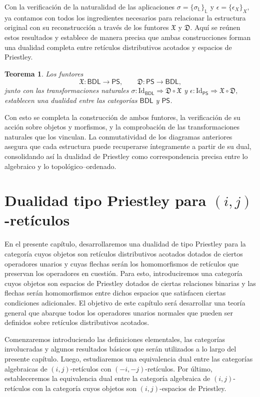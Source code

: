 \documentclass[12pt]{book}
\newtheorem{theorem}{Teorema}[section]
\newcommand{\X}{\mathfrak{X}}
\newcommand{\D}{\mathfrak{D}}
\begin{document}
\medskip

Con la verificación de la naturalidad de las aplicaciones
\(
\sigma=\{\sigma_{\mathbb{L}}\}_{\mathbb{L}}
\)
y
\(
\epsilon=\{\epsilon_{X}\}_{X},
\)
ya contamos con todos los ingredientes necesarios para relacionar
la estructura original con su reconstrucción a través de los funtores
\(\X\) y \(\D\). Aquí se reúnen estos resultados y establece de manera precisa que ambas construcciones forman una dualidad completa entre
retículos distributivos acotados y espacios de Priestley.

\begin{theorem}
Los funtores 
\[
\X\colon \mathsf{BDL}\to\mathsf{PS},
\qquad
\D\colon \mathsf{PS}\to\mathsf{BDL},
\]
junto con las transformaciones naturales
\(
\sigma\colon \mathrm{Id}_{\mathsf{BDL}} \Rightarrow \D\circ\X
\)
y
\(
\epsilon\colon \mathrm{Id}_{\mathsf{PS}} \Rightarrow \X\circ\D,
\)
establecen una dualidad entre las categorías
\(\mathsf{BDL}\) y \(\mathsf{PS}\).
\end{theorem}
Con esto se completa la construcción de ambos funtores, la verificación de su acción sobre objetos y morfismos, y la comprobación de las transformaciones naturales que los vinculan. La conmutatividad de los diagramas anteriores asegura que cada estructura puede recuperarse íntegramente a partir de su dual, consolidando así la dualidad de Priestley como correspondencia precisa entre lo algebraico y lo topológico–ordenado.



\chapter{Dualidad tipo Priestley para $(i,j)$-retículos}\label{Ch 3}



En el presente capítulo, desarrollaremos una dualidad de tipo Priestley para la categoría cuyos objetos son retículos distributivos acotados dotados de ciertos operadores unarios y cuyas flechas serán los homomorfismos de retículos que preservan los operadores en cuestión. Para esto, introduciremos una categoría cuyos objetos son espacios de Priestley dotados de ciertas relaciones binarias y las flechas serán homomorfismos entre dichos espacios que satisfacen ciertas condiciones adicionales. El objetivo de este capítulo será desarrollar una teoría general que abarque todos los operadores unarios normales que pueden ser definidos sobre retículos distributivos acotados.

Comenzaremos introduciendo las definiciones elementales, las categorías involucradas y algunos resultados básicos que serán utilizados a lo largo del presente capítulo. Luego, estudiaremos una equivalencia dual entre las categorías algebraicas de $(i,j)$-retículos con $(-i,-j)$-retículos. Por último, estableceremos la equivalencia dual entre la categoría algebraica de $(i,j)$-retículos con la categoría cuyos objetos son $(i,j)$-espacios de Priestley.  
\end{document}
